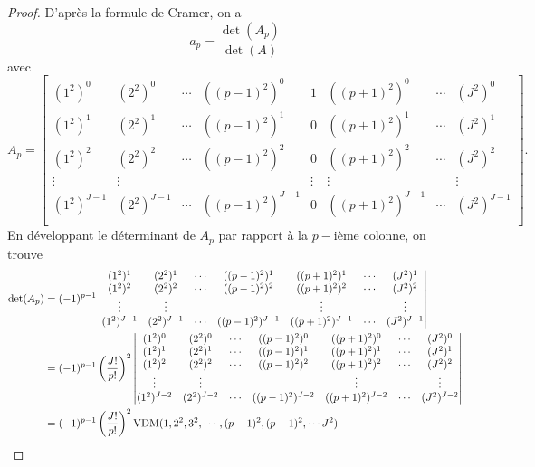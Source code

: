 \begin{proof}
D'après la formule de Cramer, on a 
\begin{equation}
a_p = \dfrac{\det (A_p)}{\det (A)}
\end{equation}
avec
\begin{equation}
A_p = \begin{bmatrix}
(1^2)^0 & (2^2)^0 & \cdots & ((p-1)^2)^0 & 1 & ((p+1)^2)^0 & \cdots & (J^2)^0 \\ 
(1^2)^1 & (2^2)^1 & \cdots & ((p-1)^2)^1 & 0 & ((p+1)^2)^1 & \cdots & (J^2)^1 \\
(1^2)^2 & (2^2)^2 & \cdots & ((p-1)^2)^2 & 0 & ((p+1)^2)^2 & \cdots & (J^2)^2 \\
\vdots & \vdots &  &  & \vdots & \vdots &  & \vdots \\
(1^2)^{J-1} & (2^2)^{J-1} & \cdots & ((p-1)^2)^{J-1} & 0 & ((p+1)^2)^{J-1} & \cdots & (J^2)^{J-1} \\
\end{bmatrix} .
\end{equation}
En développant le déterminant de $A_p$ par rapport à la $p-$ième colonne, on trouve
\begin{align*}
\det (A_p) & = (-1)^{p-1}  \begin{vmatrix}
(1^2)^1 & (2^2)^1 & \cdots & ((p-1)^2)^1 & ((p+1)^2)^1 & \cdots & (J^2)^1 \\
(1^2)^2 & (2^2)^2 & \cdots & ((p-1)^2)^2 & ((p+1)^2)^2 & \cdots & (J^2)^2 \\
\vdots & \vdots &  &  & \vdots & & \vdots \\
(1^2)^{J-1} & (2^2)^{J-1} & \cdots & ((p-1)^2)^{J-1} & ((p+1)^2)^{J-1} & \cdots & (J^2)^{J-1} \\
\end{vmatrix} \\
	& = (-1)^{p-1} \left( \dfrac{J!}{p!} \right)^2 \begin{vmatrix}
(1^2)^0 & (2^2)^0 & \cdots & ((p-1)^2)^0 & ((p+1)^2)^0 & \cdots & (J^2)^0 \\ 
(1^2)^1 & (2^2)^1 & \cdots & ((p-1)^2)^1 & ((p+1)^2)^1 & \cdots & (J^2)^1 \\
(1^2)^2 & (2^2)^2 & \cdots & ((p-1)^2)^2 & ((p+1)^2)^2 & \cdots & (J^2)^2 \\
\vdots & \vdots &  &  & \vdots & & \vdots \\
(1^2)^{J-2} & (2^2)^{J-2} & \cdots & ((p-1)^2)^{J-2} & ((p+1)^2)^{J-2} & \cdots & (J^2)^{J-2} \\
\end{vmatrix} \\
	& = (-1)^{p-1} \left( \dfrac{J!}{p!} \right)^2 \VDM(1, 2^2, 3^2, \cdots , (p-1)^2, (p+1)^2, \cdots J^2 ) \\

\end{align*}
\end{proof}
